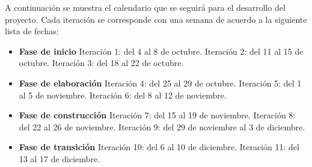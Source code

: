 A continuación se muestra el calendario que se seguirá para el desarrollo del
proyecto. Cada iteración se corresponde con una semana de acuerdo a la
siguiente lista de fechas:

\begin{itemize}
\item \textbf{Fase de inicio}
\subitem Iteración 1: del 4 al 8 de octubre.
\subitem Iteración 2: del 11 al 15 de octubre.
\subitem Iteración 3: del 18 al 22 de octubre.
\item \textbf{Fase de elaboración}
\subitem Iteración 4: del 25 al 29 de octubre.
\subitem Iteración 5: del 1 al 5 de noviembre.
\subitem Iteración 6: del 8 al 12 de noviembre.
\item \textbf{Fase de construcción}
\subitem Iteración 7: del 15 al 19 de noviembre.
\subitem Iteración 8: del 22 al 26 de noviembre.
\subitem Iteración 9: del 29 de noviembre al 3 de diciembre.
\item \textbf{Fase de transición}
\subitem Iteración 10: del 6 al 10 de diciembre.
\subitem Iteración 11: del 13 al 17 de diciembre.
\end{itemize}


